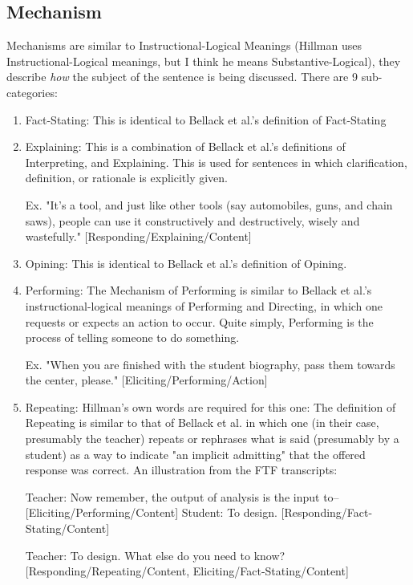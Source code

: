 \documentclass[10pt, letterpaper]{article}
\begin{document}
\subsection*{Mechanism}
\label{sec:orgcc31fdd}
Mechanisms are similar to Instructional-Logical Meanings (Hillman uses
Instructional-Logical meanings, but I think he means Substantive-Logical),
they describe \emph{how} the subject of the sentence is being discussed. There are
9 sub-categories:
\begin{enumerate}
\item Fact-Stating: This is identical to Bellack et al.'s definition of
Fact-Stating

\item Explaining: This is a combination of Bellack et al.'s definitions of
Interpreting, and Explaining. This is used for sentences in which
clarification, definition, or rationale is explicitly given.

Ex. "It's a tool, and just like other tools (say automobiles, guns, and
chain saws), people can use it constructively and destructively, wisely
and wastefully." [Responding/Explaining/Content]

\item Opining: This is identical to Bellack et al.'s definition of Opining.

\item Performing: The Mechanism of Performing is similar to Bellack et al.'s
instructional-logical meanings of Performing and Directing, in which one
requests or expects an action to occur. Quite simply, Performing is the
process of telling someone to do something. 

Ex. "When you are finished with the student biography, pass them towards
the center, please." [Eliciting/Performing/Action]

\item Repeating: Hillman's own words are required for this one: 
The definition of Repeating is similar to that of Bellack et al. in which
one (in their case, presumably the teacher) repeats or rephrases what is
said (presumably by a student) as a way to indicate "an implicit
admitting" that the offered response was correct. An illustration from the
FTF transcripts:

Teacher: Now remember, the output of analysis is the input to--
[Eliciting/Performing/Content] Student: To design.
[Responding/Fact-Stating/Content]

Teacher: To design. What else do you need to know?
[Responding/Repeating/Content, Eliciting/Fact-Stating/Content]


\end{enumerate}
\end{document}
